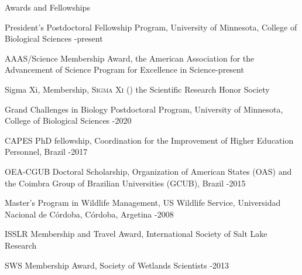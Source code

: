 \documentclass{resume} %
\begin{document}
\begin{rSection}{Awards and Fellowships}

\begin{esSubsection}{President's Postdoctoral Fellowship Program, }{\normalfont University of Minnesota, College of Biological Sciences }{-present}{}{}
\end{esSubsection}

\begin{esSubsection}{AAAS/Science Membership Award, }{\normalfont the American Association for the Advancement of Science Program for Excellence in Science}{-present}{}{}
\end{esSubsection}

\begin{esSubsection}{Sigma Xi, Membership, }{ \textsc{Sigma Xi} (\textSigma \textXi) \normalfont the Scientific Research Honor Society}{}{}{}
\end{esSubsection}

\begin{esSubsection}{Grand Challenges in Biology Postdoctoral Program, }{\normalfont University of Minnesota, College of Biological Sciences }{-2020}{}{}
\end{esSubsection}

\begin{esSubsection}{CAPES PhD fellowship, }{\normalfont Coordination for the Improvement of Higher Education Personnel, Brazil }{-2017}{}{}
\end{esSubsection}

\begin{esSubsection}{OEA-CGUB Doctoral Scholarship, }{\normalfont Organization of American States (OAS) and the Coimbra Group of Brazilian Universities (GCUB), Brazil }{-2015}{}{}
\end{esSubsection}

\begin{esSubsection}{Master’s Program in Wildlife Management, }{\normalfont US Wildlife Service, Universidad Nacional de Córdoba, Córdoba, Argetina }{-2008}{}{}
\end{esSubsection}

\begin{esSubsection}{ISSLR Membership and Travel Award, }{\normalfont International Society of Salt Lake Research }{}{}{}
\end{esSubsection}

\begin{esSubsection}{SWS Membership Award, }{\normalfont Society of Wetlands Scientists }{-2013}{}{}
\end{esSubsection}


\end{rSection}
\end{document}
